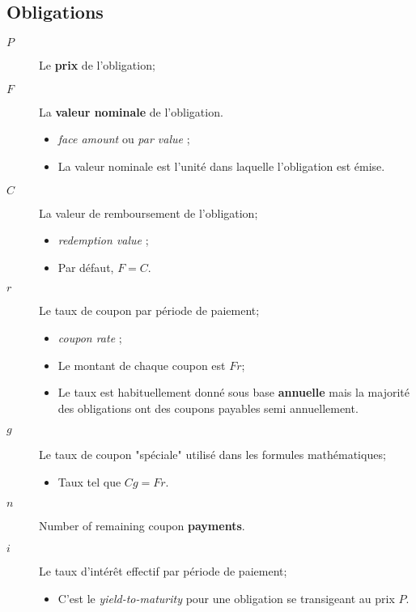 \documentclass[10pt, french]{article}
\begin{document}
\begin{multicols*}{2}
\columnbreak

\subsection*{Obligations}

\begin{distributions}[Notation]
\begin{description}
	\item[$P$]	Le \textbf{prix} de l'obligation;
	\item[$F$]	La \textbf{valeur nominale} de l'obligation.
		\begin{itemize}[leftmargin = *]
		\item	\og \textit{face amount} \fg{} ou \og \textit{par value} \fg{};
		\item	La valeur nominale est l'unité dans laquelle l'obligation est émise.
		\end{itemize}
	\item[$C$]	La valeur de remboursement de l'obligation;
		\begin{itemize}[leftmargin = *]
		\item	\og \textit{redemption value} \fg{};
		\item	Par défaut, $F = C$.
		\end{itemize}
	\item[$r$]	Le taux de coupon par période de paiement;
		\begin{itemize}[leftmargin = *]
		\item	\og \textit{coupon rate} \fg{};
		\item	Le montant de chaque coupon est $Fr$;
		\item	Le taux est habituellement donné sous base \textbf{annuelle} mais la majorité des obligations ont des coupons payables semi annuellement.
		\end{itemize}
	\item[$g$]	Le taux de coupon "spéciale" utilisé dans les formules mathématiques;
		\begin{itemize}[leftmargin = *]
		\item	Taux tel que $Cg = Fr$.
		\end{itemize}
	\item[$n$]	Number of remaining coupon \textbf{payments}.
	\item[$i$]	Le taux d'intérêt effectif par période de paiement;
		\begin{itemize}[leftmargin = *]
		\item	C'est le \og \textit{yield-to-maturity} \fg{} pour une obligation se transigeant au prix $P$.\\

\end{itemize}
\end{description}
\end{distributions}
\end{multicols*}
\end{document}
